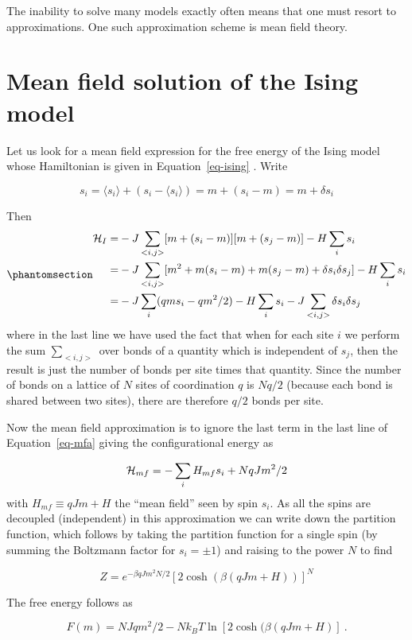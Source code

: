 \documentclass[
  letterpaper,
  enabledeprecatedfontcommands]{report}
\begin{document}
The inability to solve many models exactly often means that one must
resort to approximations. One such approximation scheme is mean field
theory.

\section{Mean field solution of the Ising model}\label{sec:mfising}

Let us look for a mean field expression for the free energy of the Ising
model whose Hamiltonian is given in Equation~\ref{eq-ising} . Write

\[s_i=\langle s_i\rangle+(s_i-\langle s_i\rangle)=m+(s_i-m)=m+\delta s_i\]

Then \begin{equation}\phantomsection\label{eq-mfa}{\begin{aligned}
{\cal H}_I=&-J\sum_{<i,j>}[m+(s_i-m)][m+(s_j-m)]-H\sum_i s_i\nonumber\\
=&-J\sum_{<i,j>}[m^2+m(s_i-m)+m(s_j-m)+\delta s_i\delta s_j]-H\sum_i s_i\nonumber\\
=&-J\sum_{i}(qms_i-qm^2/2)-H\sum_i s_i-J\sum_{<i,j>}\delta s_i\delta s_j 
\end{aligned}}\end{equation} where in the last line we have used the
fact that when for each site \(i\) we perform the sum \(\sum_{<i,j>}\)
over bonds of a quantity which is independent of \(s_j\), then the
result is just the number of bonds per site times that quantity. Since
the number of bonds on a lattice of \(N\) sites of coordination \(q\) is
\(Nq/2\) (because each bond is shared between two sites), there are
therefore \(q/2\) bonds per site.

Now the mean field approximation is to ignore the last term in the last
line of Equation~\ref{eq-mfa} giving the configurational energy as

\[
{\cal H}_{mf}=-\sum_{i}H_{mf}s_i+NqJm^2/2
\] with \(H_{mf}\equiv qJm+ H\) the ``mean field'' seen by spin \(s_i\).
As all the spins are decoupled (independent) in this approximation we
can write down the partition function, which follows by taking the
partition function for a single spin (by summing the Boltzmann factor
for \(s_i=\pm 1\)) and raising to the power \(N\) to find

\[
Z=e^{-\beta qJm^2N/2}[2\cosh(\beta(qJm+H))]^N
\]

The free energy follows as

\[F(m)=NJqm^2/2-Nk_BT\ln[2\cosh(\beta (qJm+H)]\:.\]
\end{document}
